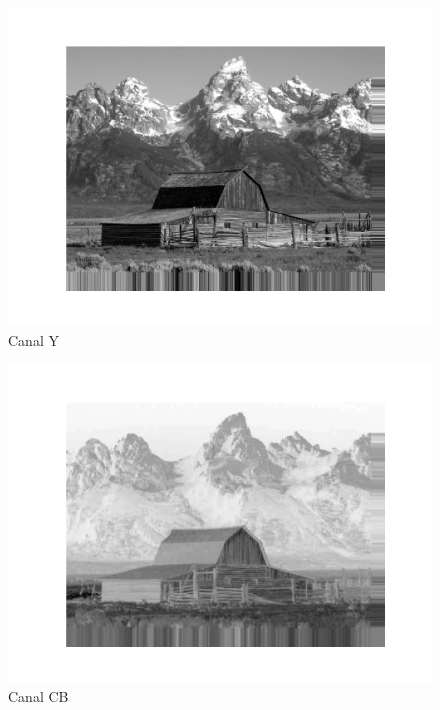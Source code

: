 \documentclass[a4paper, 12pt]{article}
\begin{document}
        \begin{multicols}{3}
            \begin{figure}[H]
                \includegraphics[width=\linewidth]{resources/Exercicio4/Y.png}
                \caption{\label{fig:my_label} Canal Y}
            \end{figure}
            \begin{figure}[H]
                \includegraphics[width=\linewidth]{resources/Exercicio4/CB.png}
                \caption{\label{fig:my_label} Canal CB}
            \end{figure}
            \begin{figure}[H]

\end{figure}
\end{multicols}
\end{document}
